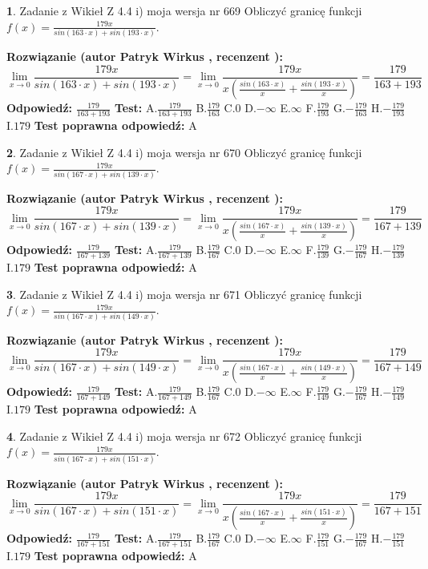 \documentclass[12pt, a4paper]{article}
\theoremstyle{definition} %
\newtheorem{zad}{}
\newcommand{\zadStart}[1]{\begin{zad}#1\newline}
\newcommand{\zadStop}{\end{zad}}
\newcommand{\rozwStart}[2]{\noindent \textbf{Rozwiązanie (autor #1 , recenzent #2): }\newline}
\newcommand{\rozwStop}{\newline}
\newcommand{\odpStart}{\noindent \textbf{Odpowiedź:}\newline}
\newcommand{\odpStop}{\newline}
\newcommand{\testStart}{\noindent \textbf{Test:}\newline}
\newcommand{\testStop}{\newline}
\newcommand{\kluczStart}{\noindent \textbf{Test poprawna odpowiedź:}\newline}
\newcommand{\kluczStop}{\newline}
\begin{document}
\zadStart{Zadanie z Wikieł Z 4.4 i) moja wersja nr 669}
Obliczyć granicę funkcji $f(x)=\frac{179x}{sin(163\cdot x) +sin(193\cdot x)}$.
\zadStop
\rozwStart{Patryk Wirkus}{}
$$\lim\limits_{x\to 0}\frac{179x}{sin(163\cdot x) +sin(193\cdot x)}=\lim\limits_{x\to 0}\frac{179x}{x(\frac{sin(163\cdot x)}{x}+\frac{sin(193\cdot x)}{x})}=\frac{179}{163+193}$$
\rozwStop
\odpStart
$\frac{179}{163+193}$
\odpStop
\testStart
A.$\frac{179}{163+193}$
B.$\frac{179}{163}$
C.$0$
D.$-\infty$
E.$\infty$
F.$\frac{179}{193}$
G.$-\frac{179}{163}$
H.$-\frac{179}{193}$
I.$179$
\testStop
\kluczStart
A
\kluczStop



\zadStart{Zadanie z Wikieł Z 4.4 i) moja wersja nr 670}
Obliczyć granicę funkcji $f(x)=\frac{179x}{sin(167\cdot x) +sin(139\cdot x)}$.
\zadStop
\rozwStart{Patryk Wirkus}{}
$$\lim\limits_{x\to 0}\frac{179x}{sin(167\cdot x) +sin(139\cdot x)}=\lim\limits_{x\to 0}\frac{179x}{x(\frac{sin(167\cdot x)}{x}+\frac{sin(139\cdot x)}{x})}=\frac{179}{167+139}$$
\rozwStop
\odpStart
$\frac{179}{167+139}$
\odpStop
\testStart
A.$\frac{179}{167+139}$
B.$\frac{179}{167}$
C.$0$
D.$-\infty$
E.$\infty$
F.$\frac{179}{139}$
G.$-\frac{179}{167}$
H.$-\frac{179}{139}$
I.$179$
\testStop
\kluczStart
A
\kluczStop



\zadStart{Zadanie z Wikieł Z 4.4 i) moja wersja nr 671}
Obliczyć granicę funkcji $f(x)=\frac{179x}{sin(167\cdot x) +sin(149\cdot x)}$.
\zadStop
\rozwStart{Patryk Wirkus}{}
$$\lim\limits_{x\to 0}\frac{179x}{sin(167\cdot x) +sin(149\cdot x)}=\lim\limits_{x\to 0}\frac{179x}{x(\frac{sin(167\cdot x)}{x}+\frac{sin(149\cdot x)}{x})}=\frac{179}{167+149}$$
\rozwStop
\odpStart
$\frac{179}{167+149}$
\odpStop
\testStart
A.$\frac{179}{167+149}$
B.$\frac{179}{167}$
C.$0$
D.$-\infty$
E.$\infty$
F.$\frac{179}{149}$
G.$-\frac{179}{167}$
H.$-\frac{179}{149}$
I.$179$
\testStop
\kluczStart
A
\kluczStop



\zadStart{Zadanie z Wikieł Z 4.4 i) moja wersja nr 672}
Obliczyć granicę funkcji $f(x)=\frac{179x}{sin(167\cdot x) +sin(151\cdot x)}$.
\zadStop
\rozwStart{Patryk Wirkus}{}
$$\lim\limits_{x\to 0}\frac{179x}{sin(167\cdot x) +sin(151\cdot x)}=\lim\limits_{x\to 0}\frac{179x}{x(\frac{sin(167\cdot x)}{x}+\frac{sin(151\cdot x)}{x})}=\frac{179}{167+151}$$
\rozwStop
\odpStart
$\frac{179}{167+151}$
\odpStop
\testStart
A.$\frac{179}{167+151}$
B.$\frac{179}{167}$
C.$0$
D.$-\infty$
E.$\infty$
F.$\frac{179}{151}$
G.$-\frac{179}{167}$
H.$-\frac{179}{151}$
I.$179$
\testStop
\kluczStart
A
\kluczStop
\end{document}
